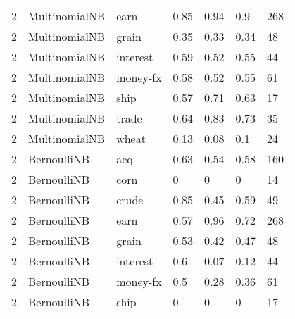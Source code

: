 \documentclass{article}
\begin{document}
\begin{table}[h]
\begin{tabular}{lllllll}
2             & MultinomialNB          & earn            & 0.85               & 0.94            & 0.9               & 268              \\
2             & MultinomialNB          & grain           & 0.35               & 0.33            & 0.34              & 48               \\
2             & MultinomialNB          & interest        & 0.59               & 0.52            & 0.55              & 44               \\
2             & MultinomialNB          & money-fx        & 0.58               & 0.52            & 0.55              & 61               \\
2             & MultinomialNB          & ship            & 0.57               & 0.71            & 0.63              & 17               \\
2             & MultinomialNB          & trade           & 0.64               & 0.83            & 0.73              & 35               \\
2             & MultinomialNB          & wheat           & 0.13               & 0.08            & 0.1               & 24               \\
2             & BernoulliNB            & acq             & 0.63               & 0.54            & 0.58              & 160              \\
2             & BernoulliNB            & corn            & 0                  & 0               & 0                 & 14               \\
2             & BernoulliNB            & crude           & 0.85               & 0.45            & 0.59              & 49               \\
2             & BernoulliNB            & earn            & 0.57               & 0.96            & 0.72              & 268              \\
2             & BernoulliNB            & grain           & 0.53               & 0.42            & 0.47              & 48               \\
2             & BernoulliNB            & interest        & 0.6                & 0.07            & 0.12              & 44               \\
2             & BernoulliNB            & money-fx        & 0.5                & 0.28            & 0.36              & 61               \\
2             & BernoulliNB            & ship            & 0                  & 0               & 0                 & 17               \\

\end{tabular}
\end{table}
\end{document}
